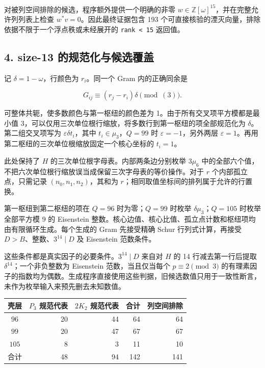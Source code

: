 \documentclass[
  11pt,
  a4paper,
]{article}
\begin{document}
对被列空间排除的候选，程序额外提供一个明确的非零
\(w\in\mathbb Z[\omega]^{15}\)，并在完整允许列列表上检查
\(w^*v=0\)。因此最终证据包含 193
个可直接核验的湮灭向量，排除依据不限于一个浮点秩或未经展开的
\texttt{rank\ \textless{}\ 15} 返回值。

\subsection{4. size-13
的规范化与候选覆盖}\label{size-13-ux7684ux89c4ux8303ux5316ux4e0eux5019ux9009ux8986ux76d6}

记 \(\delta=1-\omega\)，行颜色为 \(r_i\)。同一个 Gram 内的正确同余是

\[G_{ij}\equiv(r_j-r_i)\delta\pmod{(3)}.\]

可整体共轭，使多数颜色与第一枢纽的颜色差为
1。由于所有交叉项平方模都是最小值
3，可以仅用三次单位根行缩放，将多数行到第一枢纽的项全部规范化为
\(\delta\)。第二组交叉项写为 \(\varepsilon\delta t_i\)，其中
\(t_i\in\mu_3\)，\(Q=99\) 时 \(\varepsilon=-1\)，另外两层
\(\varepsilon=1\)。再用第二枢纽的三次单位根缩放固定一个核心坐标的
\(t_i=1\)。

此处保持了 \(H\) 的三次单位根字母表。内部两条边分别枚举 \(3\mu_6\)
中的全部六个值，不把六次单位根行缩放误当成保留三次字母表的等价操作。对于
\(r\) 个内部孤立点，只需记录 \((n_0,n_1,n_2)\)，其和为
\(r\)；相同取值坐标间的排列属于允许的行置换。

第一枢纽到第二枢纽的项在 \(Q=96\) 时为零；\(Q=99\) 时枚举
\(\delta\mu_3\)；\(Q=105\) 时枚举全部平方模 9 的 Eisenstein
整数。核心边值、核心比值、孤立点计数和枢纽项均由有限循环生成。每个生成的
Gram 先接受精确 Schur 行列式计算，再接受 \(D>B\)、整数、\(3^{14}\mid D\)
及 Eisenstein 范数条件。

这些条件都是真实因子的必要条件。\(3^{14}\mid D\) 来自对 \(H\) 的 14
行减去第一行后提取 \(\delta^{14}\)；一个非负整数为 Eisenstein
范数，当且仅当每个 \(p\equiv2\pmod3\)
的有理素因子的指数均为偶数。生成程序直接使用这些判据，旧候选数值只用于一致性断言，未作为枚举输入来预先删去未知数值。

\begin{longtable}[]{@{}crrrr@{}}
\toprule\noalign{}
壳层 & \(P_3\) 规范代表 & \(2K_2\) 规范代表 & 合计 & 列空间排除 \\
\midrule\noalign{}
\endhead
\bottomrule\noalign{}
\endlastfoot
\(96\) & 20 & 44 & 64 & 64 \\
\(99\) & 20 & 47 & 67 & 67 \\
\(105\) & 8 & 3 & 11 & 10 \\
合计 & 48 & 94 & 142 & 141 \\
\end{longtable}
\end{document}
